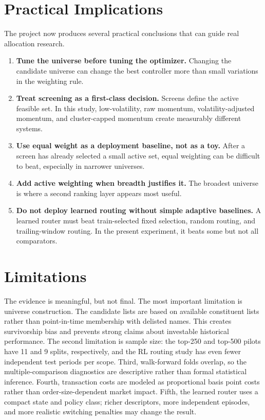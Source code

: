 \documentclass[11pt,a4paper]{article}
\begin{document}
\section{Practical Implications}
The project now produces several practical conclusions that can guide real allocation research.
\begin{enumerate}[leftmargin=1.5em]
\item \textbf{Tune the universe before tuning the optimizer.} Changing the candidate universe can change the best controller more than small variations in the weighting rule.
\item \textbf{Treat screening as a first-class decision.} Screens define the active feasible set. In this study, low-volatility, raw momentum, volatility-adjusted momentum, and cluster-capped momentum create measurably different systems.
\item \textbf{Use equal weight as a deployment baseline, not as a toy.} After a screen has already selected a small active set, equal weighting can be difficult to beat, especially in narrower universes.
\item \textbf{Add active weighting when breadth justifies it.} The broadest universe is where a second ranking layer appears most useful.
\item \textbf{Do not deploy learned routing without simple adaptive baselines.} A learned router must beat train-selected fixed selection, random routing, and trailing-window routing. In the present experiment, it beats some but not all comparators.
\end{enumerate}

\section{Limitations}
The evidence is meaningful, but not final. The most important limitation is universe construction. The candidate lists are based on available constituent lists rather than point-in-time membership with delisted names. This creates survivorship bias and prevents strong claims about investable historical performance. The second limitation is sample size: the top-250 and top-500 pilots have 11 and 9 splits, respectively, and the RL routing study has even fewer independent test periods per scope. Third, walk-forward folds overlap, so the multiple-comparison diagnostics are descriptive rather than formal statistical inference. Fourth, transaction costs are modeled as proportional basis point costs rather than order-size-dependent market impact. Fifth, the learned router uses a compact state and policy class; richer descriptors, more independent episodes, and more realistic switching penalties may change the result.
\end{document}
